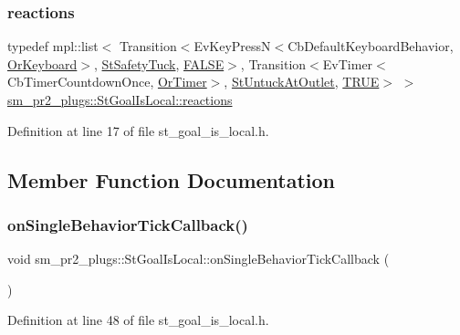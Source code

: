 \subsubsection{\texorpdfstring{reactions}{reactions}}
{\footnotesize\ttfamily typedef mpl\+::list$<$ Transition$<$Ev\+Key\+PressN$<$Cb\+Default\+Keyboard\+Behavior, \hyperlink{classsm__pr2__plugs_1_1OrKeyboard}{Or\+Keyboard}$>$, \hyperlink{structsm__pr2__plugs_1_1StSafetyTuck}{St\+Safety\+Tuck}, \hyperlink{structsm__pr2__plugs_1_1StGoalIsLocal_1_1FALSE}{F\+A\+L\+SE}$>$, Transition$<$Ev\+Timer$<$Cb\+Timer\+Countdown\+Once, \hyperlink{classsm__pr2__plugs_1_1OrTimer}{Or\+Timer}$>$, \hyperlink{structsm__pr2__plugs_1_1StUntuckAtOutlet}{St\+Untuck\+At\+Outlet}, \hyperlink{structsm__pr2__plugs_1_1StGoalIsLocal_1_1TRUE}{T\+R\+UE}$>$ $>$ \hyperlink{structsm__pr2__plugs_1_1StGoalIsLocal_a5e2307f3b40c73716bdb763e1d92dce2}{sm\+\_\+pr2\+\_\+plugs\+::\+St\+Goal\+Is\+Local\+::reactions}}



Definition at line 17 of file st\+\_\+goal\+\_\+is\+\_\+local.\+h.



\subsection{Member Function Documentation}
\mbox{\label{structsm__pr2__plugs_1_1StGoalIsLocal_a4d5abf255b17a81fe4a758a07f502e7d}} 
\subsubsection{\texorpdfstring{on\+Single\+Behavior\+Tick\+Callback()}{onSingleBehaviorTickCallback()}}
{\footnotesize\ttfamily void sm\+\_\+pr2\+\_\+plugs\+::\+St\+Goal\+Is\+Local\+::on\+Single\+Behavior\+Tick\+Callback (\begin{DoxyParamCaption}{ }\end{DoxyParamCaption})\hspace{0.3cm}{\ttfamily [inline]}}



Definition at line 48 of file st\+\_\+goal\+\_\+is\+\_\+local.\+h.



